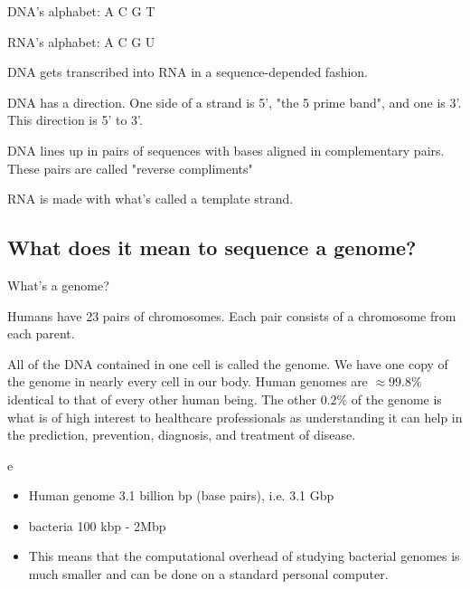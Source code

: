 DNA's alphabet: A C  G T

RNA's alphabet:  A C G U

DNA gets transcribed into RNA in a sequence-depended fashion.

DNA has a direction. One side of a strand is 5', "the 5 prime band", and one is 3'. This direction is 5' to 3'.

DNA lines up in pairs of sequences with bases aligned in complementary pairs. These pairs are called "reverse compliments"

RNA is made with what's called a template strand.

\subsection{What does it mean to sequence a genome?}

\begin{quest}
\item
	What's a genome?

	\begin{ans}
		Humans have 23 pairs of chromosomes. Each pair consists of a chromosome from each parent.

		All of the DNA contained in one cell is called the genome. We have one copy of the genome in nearly every cell in our body. Human genomes are $\approx99.8\%$  identical to that of every other human being. The other $0.2\%$ of the genome is what is of high interest to healthcare professionals as understanding it can help in the prediction, prevention, diagnosis, and treatment of disease.
	\end{ans}

\item
	e

\end{quest}

\begin{itemize}
	\item Human genome 3.1 billion bp (base pairs), i.e. 3.1 Gbp
	\item bacteria 100 kbp - 2Mbp
	\item This means that the computational overhead of studying bacterial genomes is much smaller and can be done on a standard personal computer.
\end{itemize}


